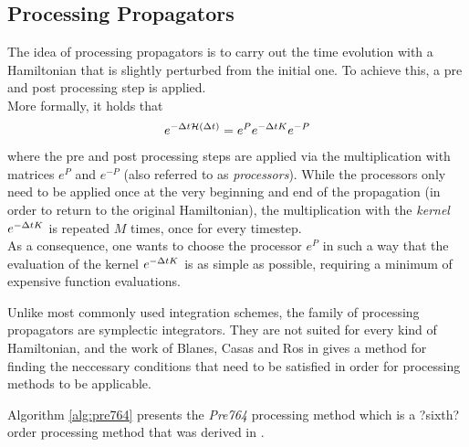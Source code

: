 \subsection{Processing Propagators}
\label{sub:pre764_propagator}
%
The idea of processing propagators is to carry out the time evolution with a Hamiltonian that is slightly perturbed from the initial one.
To achieve this, a pre and post processing step is applied. \\
More formally, it holds that
%
\begin{align}
	e^{- \Delta t \mathcal{H} (\Delta t)} = e^P e^{- \Delta t K} e^{-P}
\end{align}
%
where the pre and post processing steps are applied via the multiplication with matrices $e^P$ and $e^{-P}$ (also referred to as \emph{processors}).
While the processors only need to be applied once at the very beginning and end of the propagation (in order to return to the original Hamiltonian), the multiplication with the \emph{kernel} $e^{-\Delta t K}$ is repeated $M$ times, once for every timestep. \\
As a consequence, one wants to choose the processor $e^P$ in such a way that the evaluation of the kernel $e^{-\Delta t K}$ is as simple as possible, requiring a minimum of expensive function evaluations.
\par\medskip
%
Unlike most commonly used integration schemes, the family of processing propagators are symplectic integrators.
They are not suited for every kind of Hamiltonian, and the work of Blanes, Casas and Ros in \cite{Blanes1999} gives a method for finding the  neccessary conditions that need to be satisfied in order for processing methods to be applicable.
\par\medskip
%
Algorithm \ref{alg:pre764} presents the \emph{Pre764} processing method which is a ?sixth? order processing method that was derived in \cite{Blanes1999}.
%
